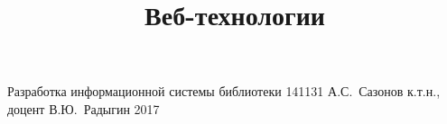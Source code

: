 \documentclass[a4paper,12pt]{memoir}
\begin{document}
	\renewcommand{\contentsname}{{\Large{Содержание}\hfill}}

	\title{Веб-технологии}
	{Разработка информационной системы библиотеки}
	{141131}
	{А.\+С.~Сазонов}
	{к.т.н., доцент}
	{В.\+Ю.~Радыгин}
	{2017}



	
	\newpage

	
	\newpage

%	
%
%	

	
	\newpage

	
	\newpage

\end{document}
